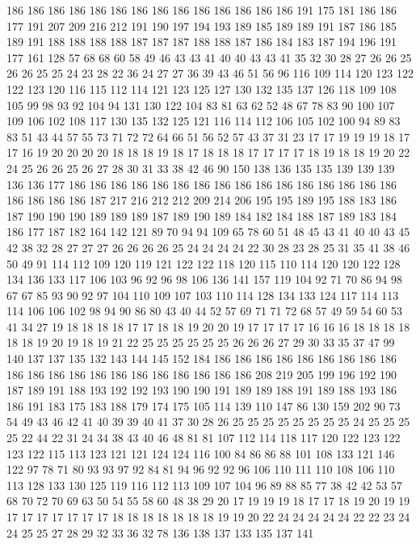 186 186 186 186 186 186 186 186 186 186 186 186 186 186 191 175 181 186 186 177
191 207 209 216 212 191 190 197 194 193 189 185 189 189 191 187 186 185 189 191
188 188 188 188 187 187 187 188 188 187 186 184 183 187 194 196 191 177 161 128
57 68 68 60 58 49 46 43 43 41 40 40 43 43 41 35 32 30 28 27
26 26 25 26 26 25 25 24 23 28 22 36 24 27 27 36 39 43 46 51
56 96 116 109 114 120 123 122 122 123 120 116 115 112 114 121 123 125 127 130
132 135 137 126 118 109 108 105 99 98 93 92 104 94 131 130 122 104 83 81
63 62 52 48 67 78 83 90 100 107 109 106 102 108 117 130 135 132 125 121
116 114 112 106 105 102 100 94 89 83 83 51 43 44 57 55 73 71 72 72
64 66 51 56 52 57 43 37 31 23 17 17 19 19 19 18 17 17 16 19
20 20 20 20 18 18 18 19 18 17 18 18 18 17 17 17 17 18 19 18
18 19 20 22 24 25 26 26 25 26 27 28 30 31 33 38 42 46 90 150
138 136 135 135 139 139 139 136 136 177 186 186 186 186 186 186 186 186 186 186
186 186 186 186 186 186 186 186 186 186 187 217 216 212 212 209 214 206 195 195
189 195 188 183 186 187 190 190 190 189 189 189 187 189 190 189 184 182 184 188
187 189 183 184 186 177 187 182 164 142 121 89 70 94 94 109 65 78 60 51
48 45 43 41 40 40 43 45 42 38 32 28 27 27 27 26 26 26 26 25
24 24 24 24 22 30 28 23 28 25 31 35 41 38 46 50 49 91 114 112
109 120 119 121 122 122 118 120 115 110 114 120 120 122 128 134 136 133 117 106
103 96 92 96 98 106 136 141 157 119 104 92 71 70 86 94 98 67 67 85
93 90 92 97 104 110 109 107 103 110 114 128 134 133 124 117 114 113 114 106
106 102 98 94 90 86 80 43 40 44 52 57 69 71 71 72 68 57 49 59
54 60 53 41 34 27 19 18 18 18 18 17 17 18 18 19 20 20 19 17
17 17 17 16 16 16 18 18 18 18 18 18 19 20 19 18 19 21 22 25
25 25 25 25 25 26 26 26 27 29 30 33 35 37 47 99 140 137 137 135
132 143 144 145 152 184 186 186 186 186 186 186 186 186 186 186 186 186 186 186
186 186 186 186 186 186 186 208 219 205 199 196 192 190 187 189 191 188 193 192
192 193 190 190 191 189 189 188 191 189 188 193 186 186 191 183 175 183 188 179
174 175 105 114 139 110 147 86 130 159 202 90 73 54 49 43 46 42 41 40
39 39 40 41 37 30 28 26 25 25 25 25 25 25 25 25 24 25 25 25
25 22 44 22 31 24 34 38 43 40 46 48 81 81 107 112 114 118 117 120
122 123 122 123 122 115 113 123 121 121 124 124 116 100 84 86 86 88 101 108
133 121 146 122 97 78 71 80 93 93 97 92 84 81 94 96 92 92 96 106
110 111 110 108 106 110 113 128 133 130 125 119 116 112 113 109 107 104 96 89
88 85 77 38 42 42 53 57 68 70 72 70 69 63 50 54 55 58 60 48
38 29 20 17 19 19 19 18 17 17 18 19 20 19 19 17 17 17 17 17
17 17 18 18 18 18 18 18 18 19 19 20 22 24 24 24 24 24 22 22
23 24 24 25 25 27 28 29 32 33 36 32 78 136 138 137 133 135 137 141
